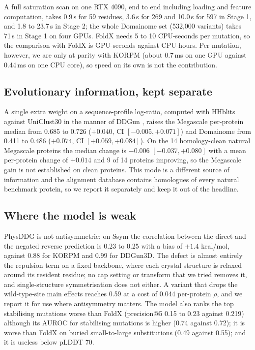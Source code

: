 \documentclass[unnumsec,webpdf,contemporary,large]{oup-authoring-template}
\begin{document}
A full saturation scan on one RTX 4090, end to end including loading and feature computation, takes 0.9\,s for
59 residues, 3.6\,s for 269 and 10.0\,s for 597 in Stage 1, and 1.8 to 23.7\,s in Stage 2; the whole Domainome
set (532,000 variants) takes 71\,s in Stage 1 on four GPUs. FoldX needs 5 to 10 CPU-seconds per mutation, so the
comparison with FoldX is GPU-seconds against CPU-hours. Per mutation, however, we are only at parity with KORPM
(about 0.7\,ms on one GPU against 0.44\,ms on one CPU core), so speed on its own is not the contribution.

\subsection{Evolutionary information, kept separate}

A single extra weight on a sequence-profile log-ratio, computed with HHblits against UniClust30
\citep{steinegger2019} in the manner of DDGun \citep{montanucci2019}, raises the Megascale per-protein median
from 0.685 to 0.726 ($+0.040$, CI $[-0.005, +0.071]$) and Domainome from 0.411 to 0.486 ($+0.074$, CI $[+0.059,
+0.084]$). On the 14 homology-clean natural Megascale proteins the median change is $-0.006$ $[-0.037, +0.080]$
with a mean per-protein change of $+0.014$ and 9 of 14 proteins improving, so the Megascale gain is not
established on clean proteins. This mode is a different source of information and the alignment database
contains homologues of every natural benchmark protein, so we report it separately and keep it out of the
headline.

\subsection{Where the model is weak}

PhysDDG is not antisymmetric: on Ssym the correlation between the direct and the negated reverse prediction is
0.23 to 0.25 with a bias of $+1.4$ kcal/mol, against 0.88 for KORPM and 0.99 for DDGun3D. The defect is almost
entirely the repulsion term on a fixed backbone, where each crystal structure is relaxed around its resident
residue; no cap setting or transform that we tried removes it, and single-structure symmetrisation does not
either. A variant that drops the wild-type-site main effects reaches 0.59 at a cost of 0.044 per-protein $\rho$,
and we report it for use where antisymmetry matters. The model also ranks the top stabilising mutations worse
than FoldX (precision@5 0.15 to 0.23 against 0.219) although its AUROC for stabilising mutations is higher
(0.74 against 0.72); it is worse than FoldX on buried small-to-large substitutions (0.49 against 0.55); and it is
useless below pLDDT 70.
\end{document}

